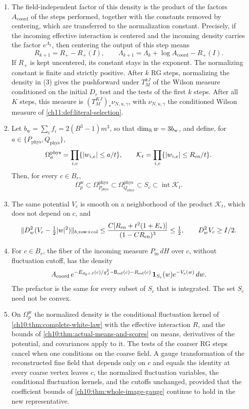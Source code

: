 \begin{theorem}
\begin{enumerate}
\[
 \one_{D_r}e^{-E_{kJ,\mathrm{sat}}/g_{kJ}^2-R_{k,\mathrm{sat}}}\,dH,
\]
where $g_{kJ}^2=\gamma/n_{kJ}$ is the coupling of the lattice of side $n_{kJ}$.
\item The field-independent factor of this density is the product of the factors $A_{\mathrm{coord}}$ of the steps performed, together with the constants removed by centering, which are transferred to the normalization constant. Precisely, if the incoming effective interaction is centered and the incoming density carries the factor $e^{\Lambda_k}$, then centering the output of this step means
\[
 R_{k+1}=R_+-R_+(I),\qquad
 \Lambda_{k+1}=\Lambda_k+\log A_{\mathrm{coord}}-R_+(I).
\]
If $R_+$ is kept uncentered, its constant stays in the exponent. The normalizing constant is finite and strictly positive. After $k$ RG steps, normalizing the density in (3) gives the pushforward under $T_M^{kJ}$ of the Wilson measure conditioned on the initial $D_r$ test and the tests of the first $k$ steps. After all $K$ steps, this measure is $(T_M^{KJ})_*\nu_{N,u,\gamma}$, with $\nu_{N,u,\gamma}$ the conditioned Wilson measure of \cref{ch11:def:literal-selection}.
\item Let $b_{\mathrm w}=\sum_if_i=2(B^3-1)m^3$, so that $\dim_\mathbb R w=3b_{\mathrm w}$, and define, for $a\in\{P_{\mathrm{phys}},Q_{\mathrm{phys}}\}$,
\[
 \Omega_a^{\mathrm{phys}}=\prod_{i,e}\{\lvert w_{i,e}\rvert\le a/t\},\qquad
 \mathcal K_t=\prod_{i,e}\{\lvert w_{i,e}\rvert\le R_{\mathrm{en}}/t\}.
\]
Then, for every $c\in B_r$,
\[
 \Omega_p^{\mathrm w}\subset\Omega_{P_{\mathrm{phys}}}^{\mathrm{phys}}
 \subset\Omega_{Q_{\mathrm{phys}}}^{\mathrm{phys}}
 \subset S_c\subset\operatorname{int}\mathcal K_t.
\]
\item The same potential $V_c$ is smooth on a neighborhood of the product $\mathcal K_t$, which does not depend on $c$, and
\[
 \lVert D_w^2(V_c-\tfrac12\lvert w\rvert^2)\rVert_{b,\mathrm{row+col}}
 \le\frac{C[R_{\mathrm{en}}+t^2(1+E_*)]}{(1-CR_{\mathrm{en}})^3}\le\tfrac12,
 \qquad D_w^2V_c\ge I/2.
\]
\item For $c\in B_r$, the fiber of the incoming measure $P_{\mathrm{in}}\,dH$ over $c$, without fluctuation cutoff, has the density
\[
 A_{\mathrm{coord}}\,e^{-E_{d_0+J}(c)/g_J^2-\mathsf B_{\mathrm{ref}}(c)-R_{\mathrm{ref}}(c)}\,
 \mathbf 1_{S_c}(w)e^{-V_c(w)}\,dw.
\]
The prefactor is the same for every subset of $S_c$ that is integrated. The set $S_c$ need not be convex.
\item On $\Omega_p^{\mathrm w}$ the normalized density is the conditional fluctuation kernel of \cref{ch10:thm:complete-white-law} with the effective interaction $R$, and the bounds of \cref{ch10:thm:actual-means-and-scores} on means, derivatives of the potential, and covariances apply to it. The tests of the coarser RG steps cancel when one conditions on the coarse field. A gauge transformation of the reconstructed fine field that depends only on $c$ and equals the identity at every coarse vertex leaves $c$, the normalized fluctuation variables, the conditional fluctuation kernels, and the cutoffs unchanged, provided that the coefficient bounds of \cref{ch10:thm:whole-image-gauge} continue to hold in the new representative.

\end{enumerate}
\end{theorem}
